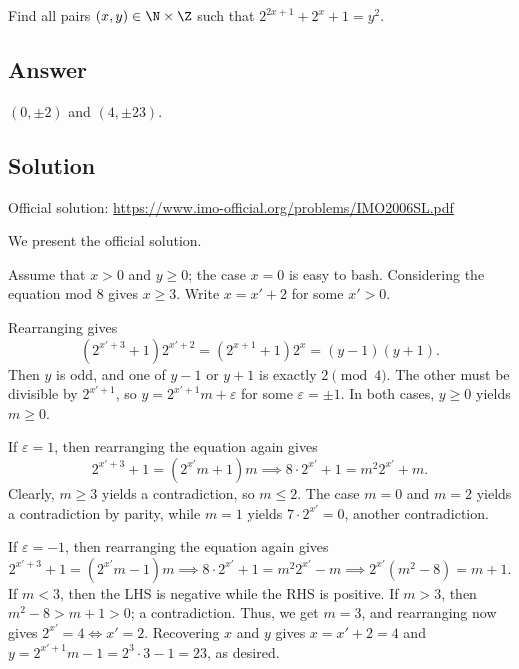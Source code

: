 Find all pairs $(x, y) \in \N \times \Z$ such that $2^{2x + 1} + 2^x + 1 = y^2$.



\subsection*{Answer}

$(0, \pm 2)$ and $(4, \pm 23)$.



\subsection*{Solution}

Official solution: \url{https://www.imo-official.org/problems/IMO2006SL.pdf}

We present the official solution.

Assume that $x > 0$ and $y \geq 0$; the case $x = 0$ is easy to bash.
Considering the equation mod $8$ gives $x \geq 3$.
Write $x = x' + 2$ for some $x' > 0$.

Rearranging gives
\[ (2^{x' + 3} + 1) 2^{x' + 2} = (2^{x + 1} + 1) 2^x = (y - 1)(y + 1). \]
Then $y$ is odd, and one of $y - 1$ or $y + 1$ is exactly $2 \pmod{4}$.
The other must be divisible by $2^{x' + 1}$, so $y = 2^{x' + 1} m + \varepsilon$ for some $\varepsilon = \pm 1$.
In both cases, $y \geq 0$ yields $m \geq 0$.

If $\varepsilon = 1$, then rearranging the equation again gives
\[ 2^{x' + 3} + 1 = (2^{x'} m + 1) m \implies 8 \cdot 2^{x'} + 1 = m^2 2^{x'} + m. \]
Clearly, $m \geq 3$ yields a contradiction, so $m \leq 2$.
The case $m = 0$ and $m = 2$ yields a contradiction by parity, while $m = 1$ yields $7 \cdot 2^{x'} = 0$, another contradiction.

If $\varepsilon = -1$, then rearranging the equation again gives
\[ 2^{x' + 3} + 1 = (2^{x'} m - 1) m \implies 8 \cdot 2^{x'} + 1 = m^2 2^{x'} - m \implies 2^{x'} (m^2 - 8) = m + 1. \]
If $m < 3$, then the LHS is negative while the RHS is positive.
If $m > 3$, then $m^2 - 8 > m + 1 > 0$; a contradiction.
Thus, we get $m = 3$, and rearranging now gives $2^{x'} = 4 \iff x' = 2$.
Recovering $x$ and $y$ gives $x = x' + 2 = 4$ and $y = 2^{x' + 1} m - 1 = 2^3 \cdot 3 - 1 = 23$, as desired.
